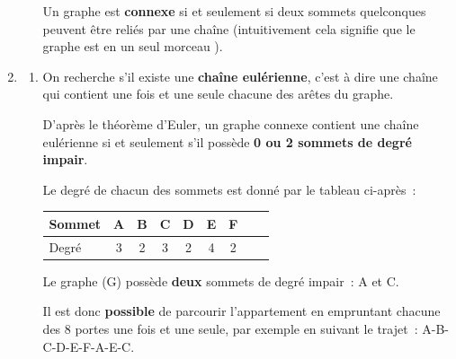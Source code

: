 \begin{corrige}
\begin{enumerate}
\begin{enumerate}[label=\alph*.]
{                    \par
                    Un graphe est \textbf{connexe} si et seulement si deux sommets quelconques peuvent être reliés par une chaîne (intuitivement cela signifie que le graphe est en \og un seul morceau \fg{}).
               }
          \end{enumerate}
          \par
          \item %
          \par
          \begin{enumerate}[label=\alph*.]
               \item %
               On recherche s'il existe une \textbf{chaîne eulérienne}, c'est à dire une chaîne qui contient une fois et une seule chacune des arêtes du graphe.
               \par
               D'après le théorème d'Euler, un graphe connexe contient une chaîne eulérienne si et seulement s'il possède \textbf{0 ou 2 sommets de degré impair}.
               \par
               Le degré de chacun des sommets est donné par le tableau ci-après~:
               \par
               \begin{center}
                    \begin{tabular}{|l|c|c|c|c|c|c|c|c|}%
                         \hline
                         Sommet & A & B & C & D & E & F  \\
                         \hline
                         Degré & 3 & 2 & 3 & 2 & 4 & 2 \\
                         \hline
                    \end{tabular}
               \end{center}
               \par
               Le graphe (G) possède \textbf{deux} sommets de degré impair~: A et C.
               \par
               Il est donc \textbf{possible} de parcourir l'appartement en empruntant chacune des 8 portes une fois et une seule, par exemple en suivant le trajet~: A-B-C-D-E-F-A-E-C.
               \par
\end{enumerate}
\end{enumerate}
\end{corrige}
